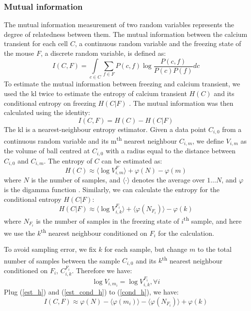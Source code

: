 \subsubsection{Mutual information}

The mutual information measurement of two random variables represents the degree of relatedness between them. The mutual information between the calcium transient for each cell $C$, a continuous random variable and the freezing state of the mouse $F$, a discrete random variable, is defined as:
\begin{equation*}
    I(C, F) = \int\limits_{c \in C} \sum_{f \in F} P(c,f)\log\frac{P(c,f)}{P(c)P(f)}dc
\end{equation*}
To estimate the mutual information between freezing and calcium transient, we used the \gls{kl} twice to estimate the entropy of calcium transient $H(C)$ and its conditional entropy on freezing $H(C|F)$ \citep{ross14, victor02}. The mutual information was then calculated using the identity:
\begin{equation} \label{cond_h}
    I(C, F) = H(C) - H(C|F)
\end{equation}
The \gls{kl} is a nearest-neighbour entropy estimator. Given a data point $C_{i,0}$ from a continuous random variable and its m\textsuperscript{th} nearest neighbour $C_{i,m}$, we define $V_{i,m}$ as the volume of ball centred at $C_{i,0}$ with a radius equal to the distance between $C_{i,0}$ and $C_{i,m}$. The entropy of $C$ can be estimated as:
\begin{equation} \label{est_h}
    H(C) \approx \langle \log V_{i,m}^F\rangle + \varphi(N) - \varphi(m)
\end{equation}
where $N$ is the number of samples, and $\langle\cdot\rangle$ denotes the average over $1\ldots N$, and $\varphi$ is the digamma function . Similarly, we can calculate the entropy for the conditional entropy $H(C|F)$:
\begin{equation} \label{est_cond_h}
    H(C|F) \approx \langle \log V_{i,k}^{F_i} \rangle + \langle \varphi(N_{F_i}) \rangle - \varphi(k)
\end{equation}
where $N_{F_i}$ is the number of samples in the freezing state of $i$\textsuperscript{th} sample, and here we use the $k$\textsuperscript{th} nearest neighbour conditioned on $F_i$ for the calculation.

To avoid sampling error, we fix $k$ for each sample, but change $m$ to the total number of samples between the sample $C_{i,0}$ and its $k$\textsuperscript{th} nearest neighbour conditioned on $F_i$, $C_{i,k}^{F_i}$. Therefore we have:
\begin{equation*}
\log V_{i, m_i} = \log V_{i, k}^{F_i}, \forall i 
\end{equation*}
Plug (\ref{est_h}) and (\ref{est_cond_h}) to (\ref{cond_h}), we have:
\begin{equation*}
    I(C, F) \approx \varphi(N) - \langle\varphi(m_i)\rangle - \langle\varphi(N_{F_i})\rangle + \varphi(k)
\end{equation*}




